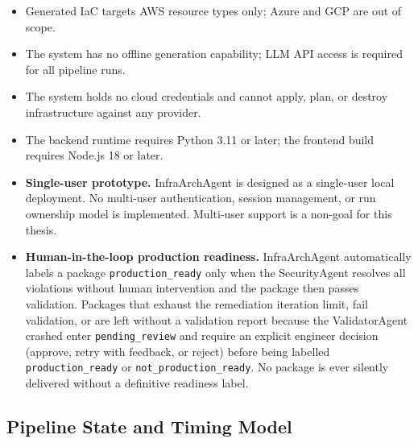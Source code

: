 \begin{itemize}
  \item Generated IaC targets AWS resource types only; Azure and GCP are
    out of scope.
  \item The system has no offline generation capability; LLM API access
    is required for all pipeline runs.
  \item The system holds no cloud credentials and cannot apply, plan, or
    destroy infrastructure against any provider.
  \item The backend runtime requires Python 3.11 or later; the frontend
    build requires Node.js 18 or later.
  \item \textbf{Single-user prototype.} InfraArchAgent is designed as a
    single-user local deployment. No multi-user authentication, session
    management, or run ownership model is implemented. Multi-user support
    is a non-goal for this thesis.
  \item \textbf{Human-in-the-loop production readiness.} InfraArchAgent
    automatically labels a package \texttt{production\_ready} only when
    the SecurityAgent resolves all violations without human intervention
    and the package then passes validation. Packages that exhaust the
    remediation iteration limit, fail validation, or are left without a
    validation report because the ValidatorAgent crashed enter
    \texttt{pending\_review} and require an explicit engineer decision
    (approve, retry with feedback, or reject) before being labelled
    \texttt{production\_ready} or \texttt{not\_production\_ready}. No
    package is ever silently delivered without a definitive readiness
    label.
\end{itemize}

\subsection*{Pipeline State and Timing Model}

